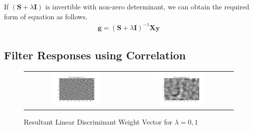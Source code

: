 \documentclass[a4paper]{article}
\begin{document}
If $\left( \boldsymbol { S } + \lambda \boldsymbol { I } \right)$ is invertible with non-zero determinant, we can obtain the required form of equation as follows.
\begin{gather}
    \mathbf { g } = \left( \boldsymbol { S } + \lambda \boldsymbol { I } \right) ^ { - 1 } \boldsymbol { X } \mathbf { y }
\end{gather}

\subsection{Filter Responses using Correlation}
\begin{figure}[!ht]
\centering
\begin{tabular}{cc}
{\includegraphics[width=0.45\textwidth]{corr-filters/g0_fliter}} &
{\includegraphics[width=0.45\textwidth]{corr-filters/g1_fliter}}
\end{tabular}
\caption{Resultant Linear Discriminant Weight Vector for $\lambda = 0, 1$}
\end{figure}
\end{document}
